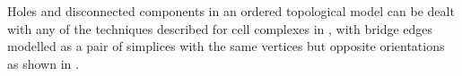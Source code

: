 Holes and disconnected components in an ordered topological model can be dealt with any of the techniques described for cell complexes in , with bridge edges modelled as a pair of simplices with the same vertices but opposite orientations as shown in .
\begin{figure}[tbp]
\centering
{}
\quad
{}
\end{figure}
